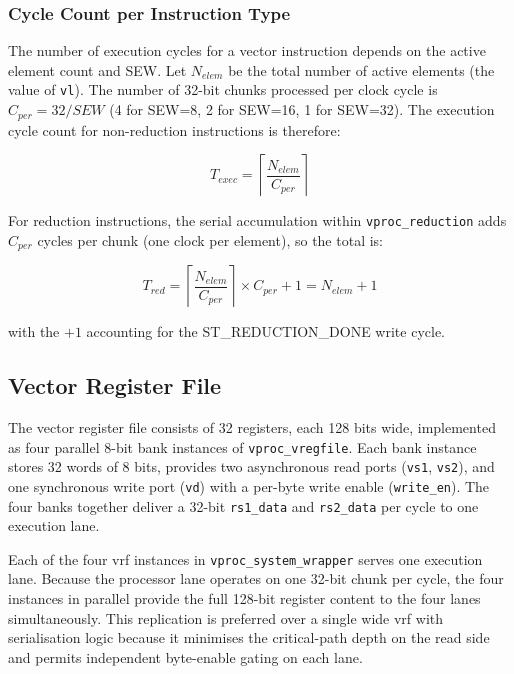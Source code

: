 \subsubsection{Cycle Count per Instruction Type}

The number of execution cycles for a vector instruction depends on the active
element count and SEW. Let $N_{elem}$ be the total number of active elements
(the value of \texttt{vl}). The number of 32-bit chunks processed per clock cycle
is $C_{per} = 32 / \mathit{SEW}$ (4 for SEW=8, 2 for SEW=16, 1 for SEW=32).
The execution cycle count for non-reduction instructions is therefore:

\begin{equation}
  T_{exec} = \left\lceil \frac{N_{elem}}{C_{per}} \right\rceil
  \label{eq:exec_cycles}
\end{equation}

For reduction instructions, the serial accumulation within \texttt{vproc\_reduction}
adds $C_{per}$ cycles per chunk (one clock per element), so the total is:

\begin{equation}
  T_{red} = \left\lceil \frac{N_{elem}}{C_{per}} \right\rceil \times C_{per} + 1
           = N_{elem} + 1
  \label{eq:red_cycles}
\end{equation}

with the $+1$ accounting for the ST\_REDUCTION\_DONE write cycle.

\subsection{Vector Register File}
\label{subsec:vrf}

The vector register file consists of 32 registers, each 128 bits wide, implemented as
four parallel 8-bit bank instances of \texttt{vproc\_vregfile}. Each bank instance
stores 32 words of 8 bits, provides two asynchronous read ports (\texttt{vs1},
\texttt{vs2}), and one synchronous write port (\texttt{vd}) with a per-byte write
enable (\texttt{write\_en}). The four banks together deliver a 32-bit \texttt{rs1\_data}
and \texttt{rs2\_data} per cycle to one execution lane.

Each of the four \gls{vrf} instances in \texttt{vproc\_system\_wrapper} serves one
execution lane. Because the processor lane operates on one 32-bit chunk per cycle, the
four instances in parallel provide the full 128-bit register content to the four lanes
simultaneously. This replication is preferred over a single wide \gls{vrf} with
serialisation logic because it minimises the critical-path depth on the read side and
permits independent byte-enable gating on each lane.


